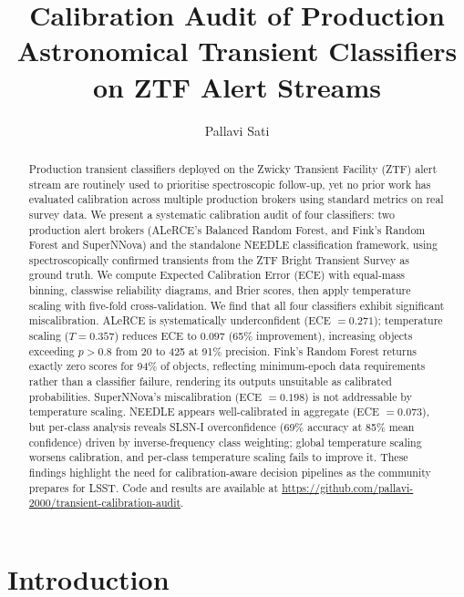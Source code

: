 \documentclass[twocolumn]{aastex631}
\begin{document}
\title{Calibration Audit of Production Astronomical Transient Classifiers on ZTF Alert Streams}

\author{Pallavi Sati}

\begin{abstract}
Production transient classifiers deployed on the Zwicky Transient Facility (ZTF) alert stream are routinely used to prioritise spectroscopic follow-up, yet no prior work has evaluated calibration across multiple production brokers using standard metrics on real survey data. We present a systematic calibration audit of four classifiers: two production alert brokers (ALeRCE's Balanced Random Forest, and Fink's Random Forest and SuperNNova) and the standalone NEEDLE classification framework, using spectroscopically confirmed transients from the ZTF Bright Transient Survey as ground truth. We compute Expected Calibration Error (ECE) with equal-mass binning, classwise reliability diagrams, and Brier scores, then apply temperature scaling with five-fold cross-validation. We find that all four classifiers exhibit significant miscalibration. ALeRCE is systematically underconfident (ECE $= 0.271$); temperature scaling ($T = 0.357$) reduces ECE to $0.097$ (65\% improvement), increasing objects exceeding $p > 0.8$ from 20 to 425 at 91\% precision. Fink's Random Forest returns exactly zero scores for 94\% of objects, reflecting minimum-epoch data requirements rather than a classifier failure, rendering its outputs unsuitable as calibrated probabilities. SuperNNova's miscalibration (ECE $= 0.198$) is not addressable by temperature scaling. NEEDLE appears well-calibrated in aggregate (ECE $= 0.073$), but per-class analysis reveals SLSN-I overconfidence (69\% accuracy at 85\% mean confidence) driven by inverse-frequency class weighting; global temperature scaling worsens calibration, and per-class temperature scaling fails to improve it. These findings highlight the need for calibration-aware decision pipelines as the community prepares for LSST. Code and results are available at \url{https://github.com/pallavi-2000/transient-calibration-audit}.
\end{abstract}


\section{Introduction} \label{sec:intro}
\end{document}

